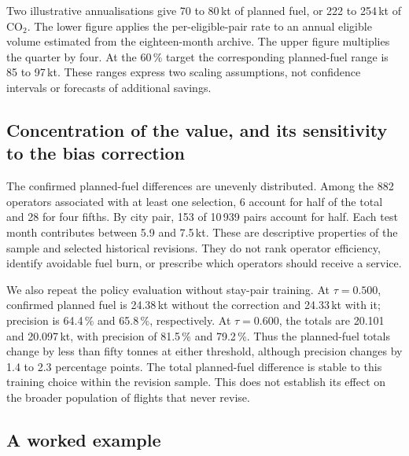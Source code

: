 \documentclass[preprint,authoryear,12pt]{elsarticle}
\begin{document}
Two illustrative annualisations give 70 to 80\,kt of planned fuel,
or 222 to 254\,kt of CO$_2$. The lower figure applies the
per-eligible-pair rate to an annual eligible volume estimated from the
eighteen-month archive. The upper figure multiplies the quarter by four.
At the 60\,\% target the corresponding planned-fuel range is 85 to
97\,kt. These ranges express two scaling assumptions, not confidence
intervals or forecasts of additional savings.

\subsection{Concentration of the value, and its sensitivity to the bias correction}
\label{sec:concentration}
\label{sec:sensitivity}

The confirmed planned-fuel differences are unevenly distributed.
Among the 882 operators associated with at least one selection, 6
account for half of the total and 28 for four fifths. By city pair,
153 of 10\,939 pairs account for half. Each test month contributes
between 5.9 and 7.5\,kt. These are descriptive properties of the
sample and selected historical revisions. They do not rank operator
efficiency, identify avoidable fuel burn, or prescribe which operators
should receive a service.

We also repeat the policy evaluation without stay-pair training.
At $\tau=0.500$, confirmed planned fuel is 24.38\,kt without the
correction and 24.33\,kt with it; precision is 64.4\,\% and
65.8\,\%, respectively. At $\tau=0.600$, the totals are 20.101 and
20.097\,kt, with precision of 81.5\,\% and 79.2\,\%. Thus the
planned-fuel totals change by less than fifty tonnes at either
threshold, although precision changes by 1.4 to 2.3 percentage points.
The total planned-fuel difference is stable to this training choice within the
revision sample. This does not establish its effect on the broader
population of flights that never revise.

\subsection{A worked example}
\end{document}
